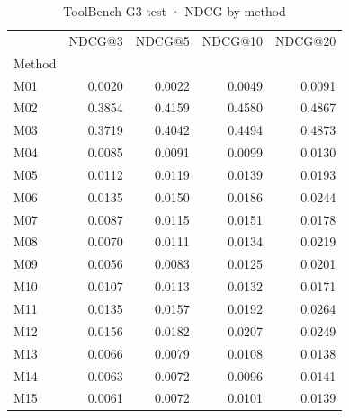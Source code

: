 \begin{table}
\caption{ToolBench G3 test · NDCG by method}
\label{tab:ToolBench-G3-test-comparison-comparison-ndcg}
\begin{tabular}{lrrrr}
\toprule
 & NDCG@3 & NDCG@5 & NDCG@10 & NDCG@20 \\
Method &  &  &  &  \\
\midrule
M01 & 0.0020 & 0.0022 & 0.0049 & 0.0091 \\
M02 & 0.3854 & 0.4159 & 0.4580 & 0.4867 \\
M03 & 0.3719 & 0.4042 & 0.4494 & 0.4873 \\
M04 & 0.0085 & 0.0091 & 0.0099 & 0.0130 \\
M05 & 0.0112 & 0.0119 & 0.0139 & 0.0193 \\
M06 & 0.0135 & 0.0150 & 0.0186 & 0.0244 \\
M07 & 0.0087 & 0.0115 & 0.0151 & 0.0178 \\
M08 & 0.0070 & 0.0111 & 0.0134 & 0.0219 \\
M09 & 0.0056 & 0.0083 & 0.0125 & 0.0201 \\
M10 & 0.0107 & 0.0113 & 0.0132 & 0.0171 \\
M11 & 0.0135 & 0.0157 & 0.0192 & 0.0264 \\
M12 & 0.0156 & 0.0182 & 0.0207 & 0.0249 \\
M13 & 0.0066 & 0.0079 & 0.0108 & 0.0138 \\
M14 & 0.0063 & 0.0072 & 0.0096 & 0.0141 \\
M15 & 0.0061 & 0.0072 & 0.0101 & 0.0139 \\
\bottomrule
\end{tabular}
\end{table}

